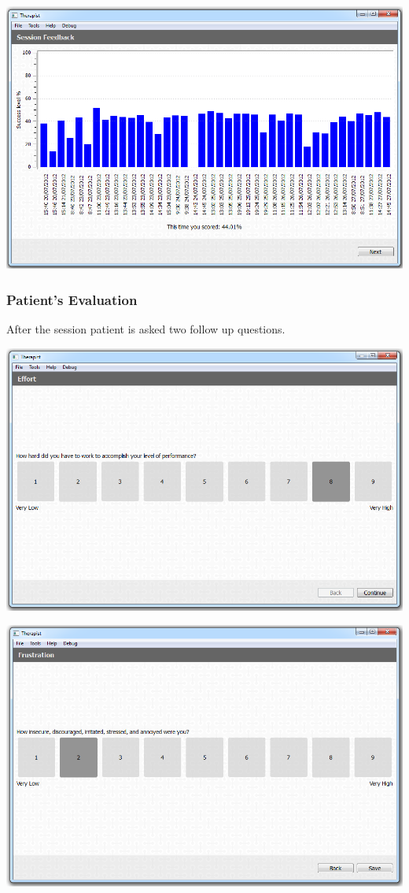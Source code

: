 \documentclass[letterpaper,10pt,english]{sphinxmanual}
\begin{document}
{\hfill\includegraphics{SessionFeedback.PNG}\hfill}


\subsubsection{Patient's Evaluation}
\label{index:patient-s-evaluation}
After the session patient is asked two follow up questions.

{\hfill\includegraphics{Evaluation.PNG}\hfill}

{\hfill\includegraphics{Evaluation2.PNG}\hfill}
\end{document}
